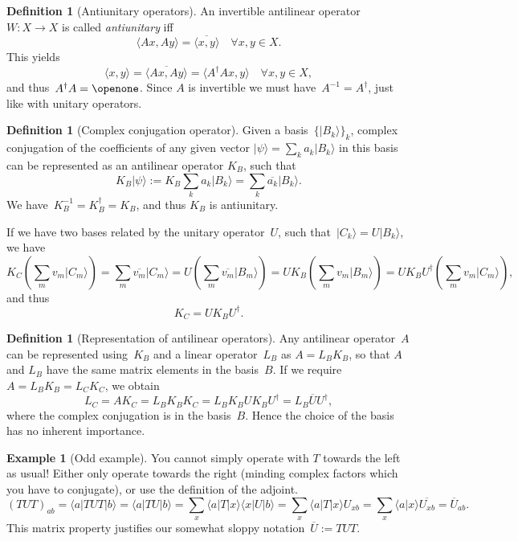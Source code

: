 \documentclass[aps,pra,12pt,nofootinbib,superscriptaddress,longbibliography,showpacs]{revtex4-1}
\theoremstyle{plain}
\theoremstyle{definition}
\newtheorem{definition}[theorem]{Definition}
\newtheorem{example}[theorem]{Example}
\newcommand{\bra}[1]{\mbox{$\langle #1|$}}
\newcommand{\ket}[1]{\ensuremath{|#1\rangle}}
\newcommand{\braket}[2]{\mbox{$\langle #1|#2\rangle$}}
\newcommand{\ketbra}[2]{\mbox{$|#1\rangle\langle #2|$}}
\newcommand{\iprod}[2]{\ensuremath{\langle #1,#2 \rangle}}
\newcommand{\I}{\openone}     %
\newcommand{\be}{\begin{equation}}
\newcommand{\ee}{\end{equation}}
\begin{document}
\begin{definition}[Antiunitary operators]
An invertible antilinear operator~$W: X \to X$ is called
\emph{antiunitary} iff
\be
\iprod{Ax}{Ay} = \overline{\iprod{x}{y}} \quad \forall x, y \in X.
\ee
This yields
\be
\iprod{x}{y} = \overline{\iprod{Ax}{Ay}} = \iprod{A^\dagger A x}{y}
\quad \forall x, y \in X,
\ee
and thus~$A^\dagger A = \I$. Since $A$ is invertible we must
have~$A^{-1} = A^\dagger$, just like with unitary operators.
\end{definition}

\begin{definition}[Complex conjugation operator]
Given a basis~$\{\ket{B_k}\}_k$, complex conjugation of the coefficients of any
given vector $\ket{\psi} = \sum_k a_k \ket{B_k}$
in this basis can be represented as an antilinear operator $K_B$, such that  
\be
K_B \ket{\psi} := K_B \sum_k a_k \ket{B_k}
= \sum_k \overline{a_k} \ket{B_k}.
\ee
We have~$K_B^{-1} = K_B^\dagger = K_B$, and thus $K_B$ is antiunitary.

If we have two bases related by the unitary operator~$U$,
such that~$\ket{C_k} = U \ket{B_k}$, we have
\be
K_C \left(\sum_m v_m \ket{C_m} \right)
= \sum_m \overline{v_m} \ket{C_m}
= U \left(\sum_m \overline{v_m} \ket{B_m} \right)
= U K_B \left(\sum_m v_m \ket{B_m} \right)
= U K_B U^{\dagger} \left(\sum_m v_m \ket{C_m} \right),
\ee
and thus
\be
K_C = U K_B U^{\dagger}.
\ee
\end{definition}

\begin{definition}[Representation of antilinear operators]
Any antilinear operator~$A$ can be represented using~$K_B$ and a
linear operator~$L_B$ as
$A = L_B K_B$,
so that $A$ and $L_B$ have the same matrix elements in the basis~$B$.
If we require $A = L_B K_B = L_C K_C$, we obtain
\be
L_C = 
A K_C = L_B K_B K_C = L_B K_B U K_B U^{\dagger}
= L_B \overline{U} U^\dagger,
\ee
where the complex conjugation is in the basis~$B$.
Hence the choice of the basis has no inherent importance.
\end{definition}

\begin{example}[Odd example]
You cannot simply operate with $T$ towards the left as usual!
Either only operate towards the right (minding complex factors which
you have to conjugate), or use the definition of the adjoint.
\be
(TUT)_{ab} = \bra{a}TUT\ket{b} = \bra{a}TU\ket{b}
= \sum_x \bra{a} T \ketbra{x}{x} U\ket{b}
= \sum_x \bra{a} T \ket{x} U_{xb}
= \sum_x \braket{a}{x} \overline{U_{xb}}
= \overline{U}_{ab}.
\ee
This matrix property justifies our somewhat sloppy
notation~$\overline{U} := TUT$.
\end{example}
\end{document}
